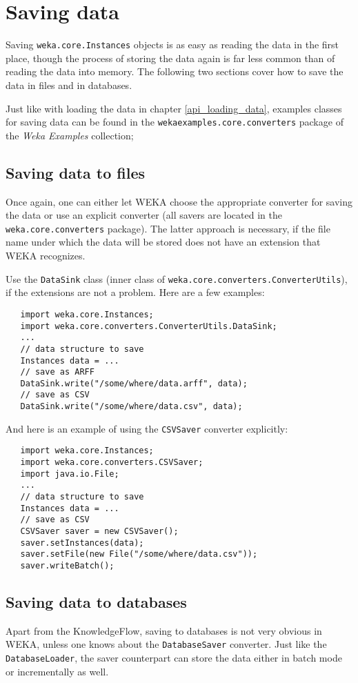 \newpage

\section{Saving data}
\label{api_saving_data}
Saving \texttt{weka.core.Instances} objects is as easy as reading the data in
the first place, though the process of storing the data again is far less common
than of reading the data into memory. The following two sections cover how to
save the data in files and in databases.

Just like with loading the data in chapter \ref{api_loading_data}, examples
classes for saving data can be found in the
\texttt{wekaexamples.core.converters} package of the \textit{Weka Examples}
collection\cite{wekaexamples};

\subsection{Saving data to files}
Once again, one can either let WEKA choose the appropriate converter for saving
the data or use an explicit converter (all savers are located in the
\texttt{weka.core.converters} package). The latter approach is necessary, if the
file name under which the data will be stored does not have an extension that
WEKA recognizes.

Use the \texttt{DataSink} class (inner class of
\texttt{weka.core.converters.ConverterUtils}), if the extensions are not a
problem. Here are a few examples:
\begin{verbatim}
   import weka.core.Instances;
   import weka.core.converters.ConverterUtils.DataSink;
   ...
   // data structure to save
   Instances data = ...
   // save as ARFF
   DataSink.write("/some/where/data.arff", data);
   // save as CSV
   DataSink.write("/some/where/data.csv", data);
\end{verbatim}
And here is an example of using the \texttt{CSVSaver} converter explicitly:
\begin{verbatim}
   import weka.core.Instances;
   import weka.core.converters.CSVSaver;
   import java.io.File;
   ...
   // data structure to save
   Instances data = ...
   // save as CSV
   CSVSaver saver = new CSVSaver();
   saver.setInstances(data);
   saver.setFile(new File("/some/where/data.csv"));
   saver.writeBatch();
\end{verbatim}

\subsection{Saving data to databases}
Apart from the KnowledgeFlow, saving to databases is not very obvious in WEKA,
unless one knows about the \texttt{DatabaseSaver} converter. Just like the
\texttt{DatabaseLoader}, the saver counterpart can store the data either in
batch mode or incrementally as well.

